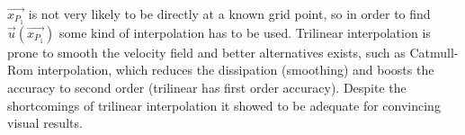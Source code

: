 \begin{math} \vec{x_{P_1}} \end{math} is not very likely to be directly at a known grid point, so in order to find \begin{math} \vec{u}(\vec{x_{P_1}}) \end{math} some kind of interpolation has to be used. Trilinear interpolation is prone to smooth the velocity field and better alternatives exists, such as Catmull-Rom interpolation, which reduces the dissipation (smoothing) and boosts the accuracy to second order (trilinear has first order accuracy). Despite the shortcomings of trilinear interpolation it showed to be adequate for convincing visual results.